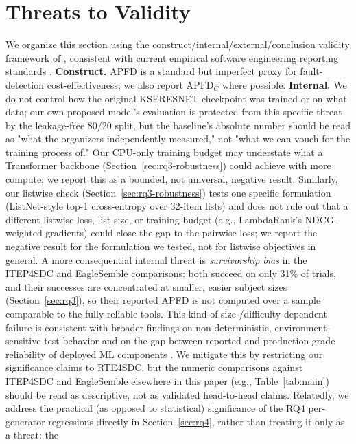 \documentclass[smallextended]{svjour3}
\begin{document}
\section{Threats to Validity}
\label{sec:threats}
We organize this section using the construct/internal/external/conclusion
validity framework of \citet{wohlin2012experimentation}, consistent with
current empirical software engineering reporting standards
\citep{ralph2020empirical}.
\textbf{Construct.} APFD is a standard but imperfect proxy for
fault-detection cost-effectiveness; we also report $\mathrm{APFD}_C$ where
possible. \textbf{Internal.} We
do not control how the original KSERESNET checkpoint was trained or on what
data; our own proposed model's evaluation is protected from this specific
threat by the leakage-free 80/20 split, but
the baseline's absolute number should be read as "what the organizers
independently measured," not "what we can vouch for the training
process of." Our CPU-only training budget may understate what a
Transformer backbone (Section~\ref{sec:rq3-robustness}) could achieve with
more compute; we report this as a bounded, not universal, negative result.
Similarly, our listwise check (Section~\ref{sec:rq3-robustness}) tests one
specific formulation (ListNet-style top-1 cross-entropy over 32-item
lists) and does not rule out that a different listwise loss, list size, or
training budget (e.g., LambdaRank's NDCG-weighted gradients) could close
the gap to the pairwise loss; we report the negative result for the
formulation we tested, not for listwise objectives in general.
A more consequential internal threat is \emph{survivorship bias} in the
ITEP4SDC and EagleSemble comparisons: both succeed on only 31\% of trials,
and their successes are concentrated at smaller, easier subject sizes
(Section~\ref{sec:rq3}), so their reported APFD is not computed over a
sample comparable to the fully reliable tools. This kind of
size-/difficulty-dependent failure is consistent with broader findings on
non-deterministic, environment-sensitive test behavior
\citep{luo2014empirical} and on the gap between reported and
production-grade reliability of deployed ML components
\citep{sculley2015hidden}. We mitigate this by
restricting our significance claims to RTE4SDC, but the numeric comparisons
against ITEP4SDC and EagleSemble elsewhere in this paper (e.g.,
Table~\ref{tab:main}) should be read as descriptive, not as validated
head-to-head claims. Relatedly, we address the practical (as opposed to
statistical) significance of the RQ4 per-generator regressions directly
in Section~\ref{sec:rq4}, rather than treating it only as a threat: the
\end{document}

